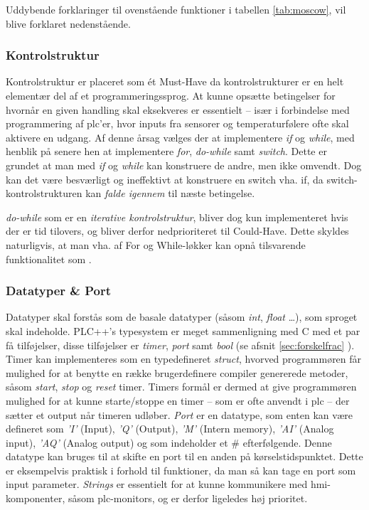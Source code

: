 \noindent Uddybende forklaringer til ovenstående funktioner i tabellen \ref{tab:moscow}, vil blive forklaret nedenstående. 

\subsubsection{Kontrolstruktur}
Kontrolstruktur er placeret som ét Must-Have da kontrolstrukturer er en helt elementær del af et programmeringssprog. At kunne opsætte betingelser for hvornår en given handling skal eksekveres er essentielt – især i forbindelse med programmering af \gls{plc}'er, hvor inputs fra sensorer og temperaturfølere ofte skal aktivere en udgang. 
Af denne årsag vælges der at implementere \textit{if} og \textit{while}, med henblik på senere hen at implementere \textit{for}, \textit{do-while} samt \textit{switch}. Dette er grundet at man med \textit{if} og \textit{while} kan konstruere de andre, men ikke omvendt. Dog kan det være besværligt og ineffektivt at konstruere en switch vha. if, da switch-kontrolstrukturen kan \textit{falde igennem} til næste betingelse.

\textit{do-while} som er en \textit{iterative kontrolstruktur}, bliver dog kun implementeret hvis der er tid tilovers, og bliver derfor nedprioriteret til Could-Have. Dette skyldes naturligvis, at man vha. af For og While-løkker kan opnå tilsvarende funktionalitet som .

\subsubsection{Datatyper \& Port}
\label{subsec:datatyper}
Datatyper skal forstås som de basale datatyper (såsom \textit{int}, \textit{float} …), som sproget skal indeholde. PLC++'s typesystem er meget sammenligning med C med et par få tilføjelser, disse tilføjelser er \textit{timer}, \textit{port} samt \textit{bool} (se afsnit \ref{sec:forskelfrac} ).
Timer kan implementeres som en typedefineret \textit{struct}, hvorved programmøren får mulighed for at benytte en række brugerdefinere compiler genererede metoder, såsom \textit{start}, \textit{stop} og \textit{reset} timer. Timers formål er dermed at give programmøren mulighed for at kunne starte/stoppe en timer – som er ofte anvendt i \gls{plc} – der sætter et output når timeren udløber.
\textit{Port} er en datatype, som enten kan være defineret som \textit{'I'} (Input), \textit{'Q'} (Output), \textit{'M'} (Intern memory), \textit{'AI'} (Analog input), \textit{'AQ'} (Analog output) og som indeholder et \# efterfølgende. Denne datatype kan bruges til at skifte en port til en anden på kørselstidspunktet. Dette er eksempelvis praktisk i forhold til funktioner, da man så kan tage en port som input parameter.
\textit{Strings} er essentielt for at kunne kommunikere med \gls{hmi}-komponenter, såsom \gls{plc}-monitors, og er derfor ligeledes høj prioritet. 

